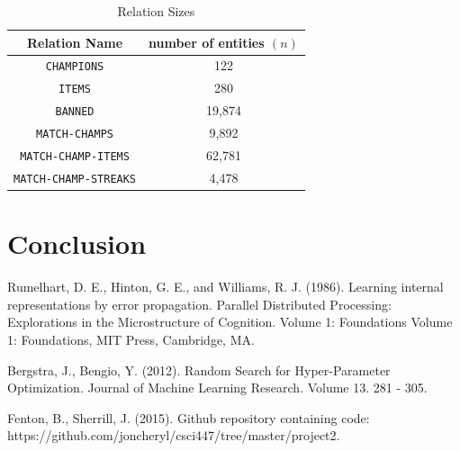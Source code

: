 \documentclass[conference]{IEEEtran}
\begin{document}
\begin{table}[H]
  \caption{Relation Sizes}
  \resizebox{1.3\textwidth}{!} {\begin{minipage}{\textwidth}

      \begin{tabular}{ | c | c |}
        \hline
        Relation Name & number of entities $(n)$ \\ \hline
        \texttt{CHAMPIONS} & 122 \\
        \texttt{ITEMS} & 280 \\
        \texttt{BANNED} & 19,874 \\
        \texttt{MATCH-CHAMPS} & 9,892 \\
        \texttt{MATCH-CHAMP-ITEMS} & 62,781 \\
        \texttt{MATCH-CHAMP-STREAKS} & 4,478 \\ \hline
      \end{tabular}

      \label{table:sizeTable}
  \end{minipage} }
\end{table}

\section{Conclusion}


\begin{thebibliography}{1}

  Rumelhart, D. E., Hinton, G. E., and Williams, R. J. (1986). Learning internal representations by error propagation. Parallel Distributed Processing: Explorations in the Microstructure of Cognition. Volume 1: Foundations Volume 1: Foundations, MIT Press, Cambridge, MA.

  Bergstra, J., Bengio, Y. (2012). Random Search for Hyper-Parameter Optimization. Journal of Machine Learning Research. Volume 13. 281 - 305.

  Fenton, B., Sherrill, J. (2015). Github repository containing code: https://github.com/joncheryl/csci447/tree/master/project2.

\end{thebibliography}
\end{document}
